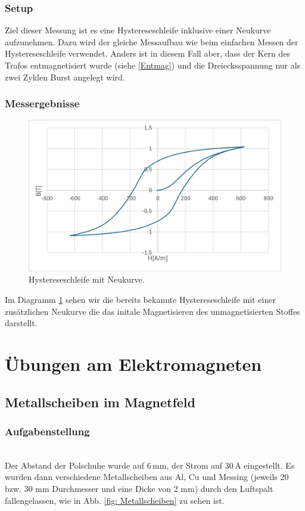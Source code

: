 \documentclass[a4paper,twoside,12pt,DIV=13,BCOR=5mm,numbers=noenddot,cleardoublepage=empty]{scrbook}
\begin{document}
\subsection{Setup}
Ziel dieser Messung ist es eine Hystereseschleife inklusive einer Neukurve aufzunehmen. 
Dazu wird der gleiche Messaufbau wie beim einfachen Messen der Hystereseschleife verwendet. Anders ist in diesem Fall aber, dass der Kern des Trafos entmagnetisiert wurde (siehe \ref{Entmag}) und 
die Dreiecksspannung nur als zwei Zyklen Burst angelegt wird.
\subsection{Messergebnisse}
\begin{figure}[H]
\centering
  \includegraphics{pictures/Neukurve.png}
  \caption{Hystereseschleife mit Neukurve.}
  \label{fig:neukurve}
\end{figure}
Im Diagramm \ref{fig:neukurve} sehen wir die bereits bekannte Hystereseschleife mit einer zus\"atzlichen Neukurve die das initale Magnetisieren des unmagnetisierten Stoffes darstellt.
\chapter{Übungen am Elektromagneten}
\section{Metallscheiben im Magnetfeld}
\label{Metallscheiben im Magnetfeld}
\subsection{Aufgabenstellung}
\noindent\\
Der Abstand der Polschuhe wurde auf 6\,mm, der Strom auf 30\,A eingestellt.
Es wurden dann verschiedene Metallscheiben aus Al, Cu und Messing (jeweils 20 bzw. 30 mm Durchmesser und eine Dicke von 2 mm) durch den Luftspalt fallengelassen, wie in Abb. \ref{fig: Metallscheiben} zu sehen ist.
\end{document}
